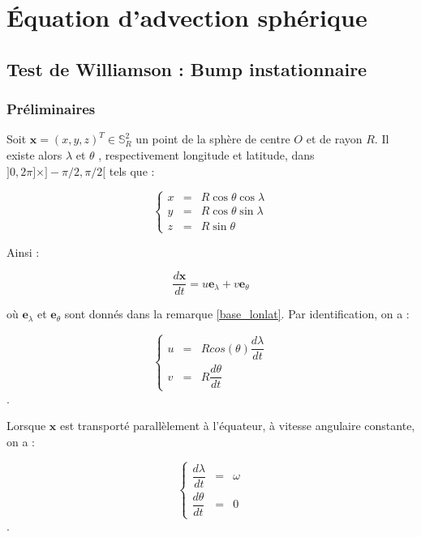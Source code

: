 
\chapter{\'Equation d'advection sphérique}

\section{Test de Williamson : Bump instationnaire}

\subsection{Préliminaires}

Soit $\mathbf{x} = (x,y,z)^T \in \mathbb{S}_R^2$ un point de la sphère de centre $O$ et de rayon $R$. Il existe alors $\lambda$ et $\theta$ , respectivement longitude et latitude, dans $] 0, 2 \pi ] \times ] - \pi /2, \pi/2 [ $ tels que :

\begin{equation}
\left\lbrace 
\begin{array}{rcl}
x & = & R \cos \theta \cos \lambda \\
y & = & R \cos \theta \sin \lambda \\
z & = & R \sin \theta
\end{array}
\right.
\end{equation}

Ainsi :

\begin{equation}
\dfrac{d \mathbf{x}}{dt} = u \mathbf{e}_{\lambda} + v \mathbf{e}_{\theta}
\end{equation}

où $\mathbf{e}_{\lambda}$ et $\mathbf{e}_{\theta}$ sont donnés dans la remarque \ref{base_lonlat}. Par identification, on a :

\begin{equation}
\left\lbrace 
\begin{array}{rcl}
u & = & R cos ( \theta ) \dfrac{d \lambda}{dt} \\
v & = & R \dfrac{d \theta}{dt}
\end{array}
\right.
\end{equation}.

Lorsque $\mathbf{x}$ est transporté parallèlement à l'équateur, à vitesse angulaire constante, on a :

\begin{equation}
\left\lbrace 
\begin{array}{rcl}
\dfrac{d \lambda}{dt} & = & \omega \\
\dfrac{d \theta}{dt} & = & 0
\end{array}
\right.
\end{equation}.

